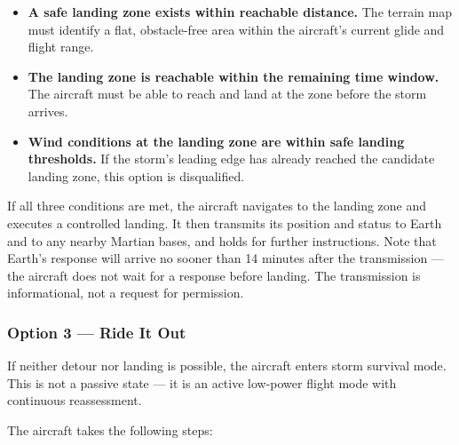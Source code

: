 \documentclass[a4paper,12pt]{article}
\begin{document}
\begin{itemize}[itemsep=0.3em]
    \item \textbf{A safe landing zone exists within reachable distance.} The terrain map must
    identify a flat, obstacle-free area within the aircraft's current glide and flight range.

    \item \textbf{The landing zone is reachable within the remaining time window.} The aircraft
    must be able to reach and land at the zone before the storm arrives.

    \item \textbf{Wind conditions at the landing zone are within safe landing thresholds.}
    If the storm's leading edge has already reached the candidate landing zone, this option
    is disqualified.
\end{itemize}

If all three conditions are met, the aircraft navigates to the landing zone and executes a
controlled landing. It then transmits its position and status to Earth and to any nearby
Martian bases, and holds for further instructions. Note that Earth's response will arrive
no sooner than 14 minutes after the transmission — the aircraft does not wait for a response
before landing. The transmission is informational, not a request for permission.

\subsubsection*{Option 3 — Ride It Out}
If neither detour nor landing is possible, the aircraft enters storm survival mode. This is
not a passive state — it is an active low-power flight mode with continuous reassessment.

The aircraft takes the following steps:
\end{document}

